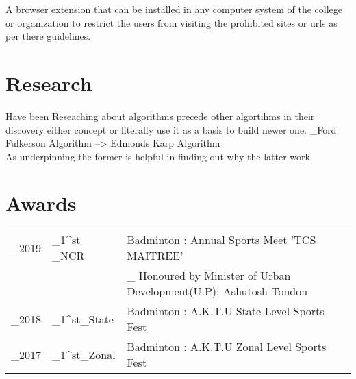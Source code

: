 \documentclass[]{deedy-resume-openfont}
\begin{document}
\begin{minipage}[t]{0.66\textwidth}
\begin{tightemize}
\end{tightemize}
\sectionsep

\vspace{\topsep} %
\begin{tightemize}
\item A browser extension that can be installed in any computer system of the college or organization to restrict the users from visiting the prohibited sites or urls as per there guidelines.

\end{tightemize}
\sectionsep


\section{Research}
\item Have been Reseaching about algorithms precede other algortihms in their discovery either concept or literally use it as a basis to build newer one.
_{Ford Fulkerson Algorithm --> Edmonds Karp Algorithm}\\
As underpinning the former is helpful in finding out why the latter work
\sectionsep


\section{Awards} 
\begin{tabular}{r l l}
_{2019} & _{1}^{st} _{NCR} & Badminton : Annual Sports Meet 'TCS MAITREE' \\
&  & _{\footnotesize{ Honoured by Minister of Urban Development(U.P): Ashutosh Tondon}}\\
_{2018} & _{1}^{st}_{State} & Badminton : A.K.T.U State Level Sports Fest \\

_{2017} & _{1}^{st}_{Zonal} & Badminton : A.K.T.U Zonal Level Sports Fest \\
\end{tabular}
\sectionsep




\end{minipage} 
\end{document}
